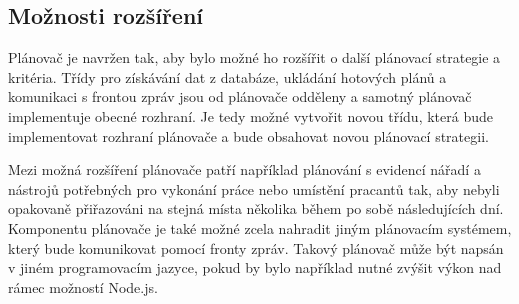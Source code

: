 \subsection{Možnosti rozšíření}

Plánovač je navržen tak, aby bylo možné ho rozšířit o další plánovací strategie a kritéria. Třídy pro získávání dat z databáze, ukládání hotových plánů
a komunikaci s frontou zpráv jsou od plánovače odděleny a samotný plánovač implementuje obecné rozhraní. Je tedy možné vytvořit novou třídu, která bude
implementovat rozhraní plánovače a bude obsahovat novou plánovací strategii.

Mezi možná rozšíření plánovače patří například plánování s evidencí nářadí a nástrojů potřebných pro vykonání práce nebo umístění pracantů tak,
aby nebyli opakovaně přiřazováni na stejná místa několika během po sobě následujících dní. Komponentu plánovače je také možné zcela nahradit
jiným plánovacím systémem, který bude komunikovat pomocí fronty zpráv. Takový plánovač může být napsán v jiném programovacím jazyce, pokud by bylo 
například nutné zvýšit výkon nad rámec možností Node.js.
